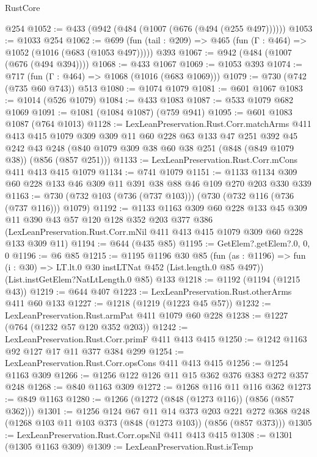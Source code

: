 \begin{lexlean}{RustCore}
\begin{coremodule}
    @254
@1052 := @433 (@942 (@484 (@1007 (@676 (@494 (@255 @497))))))
@1053 := @1033 @254
@1062 := @699 (fun (tail : @209) => @465 (fun (Γ : @464) => @1052 (@1016 (@683 (@1053 @497))))) @393
@1067 := @942 (@484 (@1007 (@676 (@494 @394))))
@1068 := @433 @1067
@1069 := @1053 @393
@1074 := @717 (fun (Γ : @464) => @1068 (@1016 (@683 @1069)))
@1079 := @730 (@742 (@735 @60 @743)) @513
@1080 := @1074 @1079
@1081 := @601 @1067
@1083 := @1014 (@526 @1079)
@1084 := @433 @1083
@1087 := @533 @1079 @682 @1069
@1091 := @1081 (@1084 @1087) (@759 @941)
@1095 := @601 @1083 @1087 (@764 @1013)
@1128 := LexLeanPreservation.Rust.Corr.matchArms
    @411
    @413
    @415
    @1079
    @309
    @309
    @11
    @60
    @228
    @63
    @133
    @47
    @251
    @392
    @45
    @242
    @43
    @248
    (@840 @1079 @309 @38 @60 @38 @251 (@848 (@849 @1079 @38)) (@856 (@857 @251)))
@1133 := LexLeanPreservation.Rust.Corr.mCons @411 @413 @415 @1079
@1134 := @741 @1079
@1151 := @1133 @1134 @309 @60 @228 @133 @46 @309 @11 @391 @38 @88 @46 @109 @270 @203 @330 @339
@1163 := @730 (@732 @103 (@736 (@737 @103))) (@730 (@732 @116 (@736 (@737 @116))) @1079)
@1192 := @1133
    @1163
    @309
    @60
    @228
    @133
    @45
    @309
    @11
    @390
    @43
    @57
    @120
    @128
    @352
    @203
    @377
    @386
    (LexLeanPreservation.Rust.Corr.mNil @411 @413 @415 @1079 @309 @60 @228 @133 @309 @11)
@1194 := @644 (@435 @85)
@1195 := GetElem?.getElem?.{0, 0, 0}
@1196 := @6 @85
@1215 := @1195
    @1196
    @30
    @85
    (fun (as : @1196) => fun (i : @30) => LT.lt.{0} @30 instLTNat @452 (List.length.{0} @85 @497))
    (List.instGetElem?NatLtLength.{0} @85)
    @133
@1218 := @1192 (@1194 (@1215 @43))
@1219 := @644 @407
@1223 := LexLeanPreservation.Rust.otherArms @411 @60 @133
@1227 := @1218 (@1219 (@1223 @45 @57))
@1232 := LexLeanPreservation.Rust.armPat @411 @1079 @60 @228
@1238 := @1227 (@764 (@1232 @57 @120 @352 @203))
@1242 := LexLeanPreservation.Rust.Corr.primF @411 @413 @415
@1250 := @1242 @1163 @92 @127 @17 @11 @377 @384 @299
@1254 := LexLeanPreservation.Rust.Corr.opsCons @411 @413 @415
@1256 := @1254 @1163 @309
@1266 := @1256 @122 @126 @11 @15 @362 @376 @383 @272 @357 @248
@1268 := @840 @1163 @309
@1272 := @1268 @116 @11 @116 @362
@1273 := @849 @1163
@1280 := @1266 (@1272 (@848 (@1273 @116)) (@856 (@857 @362)))
@1301 := @1256
    @124
    @67
    @11
    @14
    @373
    @203
    @221
    @272
    @368
    @248
    (@1268 @103 @11 @103 @373 (@848 (@1273 @103)) (@856 (@857 @373)))
@1305 := LexLeanPreservation.Rust.Corr.opsNil @411 @413 @415
@1308 := @1301 (@1305 @1163 @309)
@1309 := LexLeanPreservation.Rust.isTemp

\end{coremodule}
\end{lexlean}
